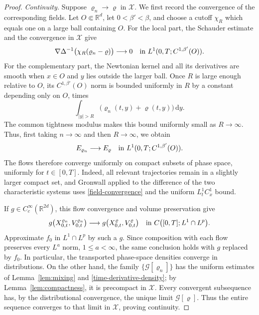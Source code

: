 \documentclass[11pt]{article}
\newcommand{\R}{\mathbb R}
\newcommand{\abs}[1]{\left\lvert #1\right\rvert}
\newcommand{\dd}{\,\mathrm d}
\begin{document}
\begin{proof}
\emph{Continuity.}
Suppose $\varrho_n\to\varrho$ in
$\mathcal X$.   We first record the convergence of the corresponding fields.
Let $O\Subset\R^d$, let $0<\beta'<\beta$, and choose a cutoff $\chi_R$
which equals one on a large ball containing $O$.  For the local part, the
Schauder estimate and the convergence in $\mathcal X$ give
\begin{equation*}
 \nabla\Delta^{-1}\bigl(\chi_R(\varrho_n-\varrho)\bigr)
 \longrightarrow0
 \quad\hbox{in }L^1(0,T;C^{1,\beta'}(O)).
\end{equation*}
For the complementary part, the Newtonian kernel and all its derivatives are
smooth when $x\in O$ and $y$ lies outside the larger ball.  Once $R$ is large
enough relative to $O$, its $C^{1,\beta'}(O)$ norm is bounded uniformly in
$R$ by a constant depending only on $O$, times
\begin{equation*}
 \int_{\abs y>R}\bigl(\varrho_n(t,y)+\varrho(t,y)\bigr)\dd y.
\end{equation*}
The common tightness modulus makes this bound uniformly small as
$R\to\infty$.  Thus, first taking $n\to\infty$ and then $R\to\infty$, we
obtain
 \begin{equation}\label{field-convergence}
 E_{\varrho_n}\longrightarrow E_\varrho
 \quad\hbox{in }L^1(0,T;C^{1,\beta'}(O)).
\end{equation}
The flows therefore converge uniformly on compact subsets of phase space,
uniformly for $t\in[0,T]$.  Indeed, all relevant trajectories remain in a
slightly larger compact set, and Gronwall applied to the difference of the
two characteristic systems uses \eqref{field-convergence} and the uniform
$L^1_tC^1_x$ bound.

If $g\in C_c^\infty(\R^{2d})$, this flow convergence and volume preservation
give
\begin{equation*}
 g\bigl(X_{0,t}^{\varrho_n},V_{0,t}^{\varrho_n}\bigr)
 \longrightarrow
 g\bigl(X_{0,t}^{\varrho},V_{0,t}^{\varrho}\bigr)
 \quad\hbox{in }C\big([0,T];L^1\cap L^p\big).
\end{equation*}
Approximate $f_0$ in $L^1\cap L^p$ by such a $g$.  Since composition with
each flow preserves every $L^a$ norm, $1\leq a<\infty$, the same conclusion
holds with $g$ replaced by $f_0$.  In particular, the transported phase-space
densities converge in distributions.  On the other hand, the family
$\{\mathcal G[\varrho_n]\}$ has the uniform estimates of
Lemma~\ref{lem:mixing} and \eqref{time-derivative-density}; by
Lemma~\ref{lem:compactness}, it is precompact in $\mathcal X$.  Every
convergent subsequence has, by the distributional convergence, the unique
limit $\mathcal G[\varrho]$.  Thus the entire sequence converges to that
limit in $\mathcal X$, proving continuity.
\end{proof}
\end{document}
